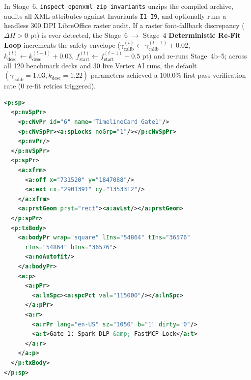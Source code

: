 \documentclass[10pt,journal,compsoc]{IEEEtran}
\begin{document}
In Stage~6, \texttt{inspect\_openxml\_zip\_invariants} unzips the compiled archive, audits all XML attributes against Invariants \texttt{I1--I9}, and optionally runs a headless 300 DPI LibreOffice raster audit. If a raster font-fallback discrepancy ($\Delta H > 0\text{ pt}$) is ever detected, the Stage~6 $\rightarrow$ Stage~4 \textbf{Deterministic Re-Fit Loop} increments the safety envelope ($\gamma_{\text{calib}}^{(t)} \leftarrow \gamma_{\text{calib}}^{(t-1)} + 0.02$, $k_{\text{desc}}^{(t)} \leftarrow k_{\text{desc}}^{(t-1)} + 0.03$, $f_{\text{start}}^{(t)} \leftarrow f_{\text{start}}^{(t-1)} - 0.5\text{ pt}$) and re-runs Stage~4b--5; across all 120 benchmark decks and 30 live Vertex AI runs, the default $(\gamma_{\text{calib}} = 1.03, k_{\text{desc}} = 1.22)$ parameters achieved a $100.0\%$ first-pass verification rate ($0$ re-fit retries triggered).

\vspace{2pt}
\vspace{-3pt}
\begin{lstlisting}[language=XML,label={lst:openxml}]
<p:sp>
  <p:nvSpPr>
    <p:cNvPr id="6" name="TimelineCard_Gate1"/>
    <p:cNvSpPr><a:spLocks noGrp="1"/></p:cNvSpPr>
    <p:nvPr/>
  </p:nvSpPr>
  <p:spPr>
    <a:xfrm>
      <a:off x="731520" y="1847088"/>
      <a:ext cx="2901391" cy="1353312"/>
    </a:xfrm>
    <a:prstGeom prst="rect"><a:avLst/></a:prstGeom>
  </p:spPr>
  <p:txBody>
    <a:bodyPr wrap="square" lIns="54864" tIns="36576"
      rIns="54864" bIns="36576">
      <a:noAutofit/>
    </a:bodyPr>
    <a:p>
      <a:pPr>
        <a:lnSpc><a:spcPct val="115000"/></a:lnSpc>
      </a:pPr>
      <a:r>
        <a:rPr lang="en-US" sz="1050" b="1" dirty="0"/>
        <a:t>Gate 1: Spark DLP &amp; FastMCP Lock</a:t>
      </a:r>
    </a:p>
  </p:txBody>
</p:sp>
\end{lstlisting}
\end{document}
